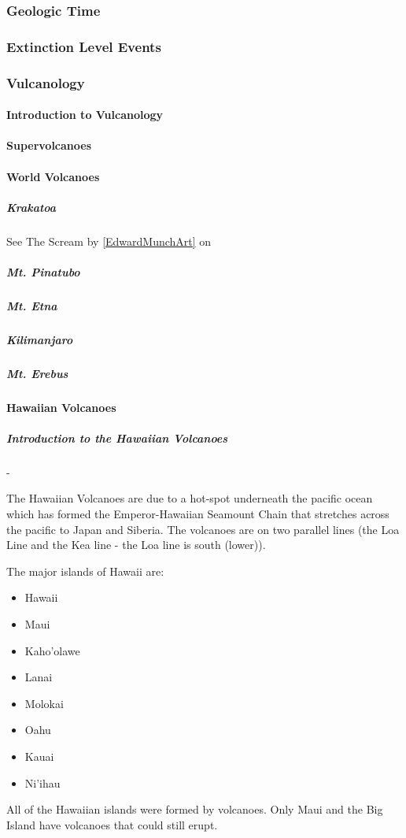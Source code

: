 			\subsubsection{Geologic Time}
			\subsubsection{Extinction Level Events}
			\subsubsection{Vulcanology}
			\paragraph{Introduction to Vulcanology}
			\paragraph{Supervolcanoes}
			\paragraph{World Volcanoes}
				\subparagraph{Krakatoa}
				\label{Krakatoa} See The Scream by \ref{EdwardMunchArt} on  
				\subparagraph{Mt. Pinatubo}
				\subparagraph{Mt. Etna}
				\subparagraph{Kilimanjaro}
				\subparagraph{Mt. Erebus} 
				
			\newpage
			\paragraph{Hawaiian Volcanoes}
				\subparagraph{Introduction to the Hawaiian Volcanoes} - 

					The Hawaiian Volcanoes are due to a hot-spot underneath the pacific ocean which has formed the Emperor-Hawaiian Seamount Chain that stretches across the pacific to Japan and Siberia.  The volcanoes are on two parallel lines (the Loa Line and the Kea line - the Loa line is south (lower)).   

					The major islands of Hawaii are: 
					\begin{multicols}{2}
					\begin{itemize}
						\item Hawaii
						\item Maui
						\item Kaho'olawe
						\item Lanai
						\item Molokai
						\item Oahu
						\item Kauai
						\item Ni'ihau
					\end{itemize}
					\end{multicols}
					All of the Hawaiian islands were formed by volcanoes.  Only Maui and the Big Island have volcanoes that could still erupt.  

